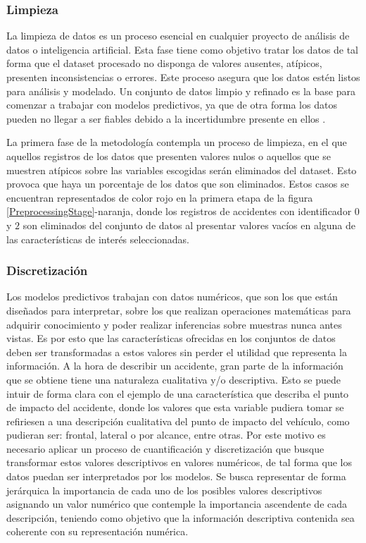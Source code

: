 \subsubsection{Limpieza}

La limpieza de datos es un proceso esencial en cualquier proyecto de análisis de datos o inteligencia artificial. Esta fase tiene como objetivo tratar los datos de tal forma que el dataset procesado no disponga de valores ausentes, atípicos, presenten inconsistencias o errores. Este proceso asegura que los datos estén listos para análisis y modelado. Un conjunto de datos limpio y refinado es la base para comenzar a trabajar con modelos predictivos, ya que de otra forma los datos pueden no llegar a ser fiables debido a la incertidumbre presente en ellos \cite{ilyas2019data}.

La primera fase de la metodología contempla un proceso de limpieza, en el que aquellos registros de los datos que presenten valores nulos o aquellos que se muestren atípicos sobre las variables escogidas serán eliminados del dataset. Esto provoca que haya un porcentaje de los datos que son eliminados. Estos casos se encuentran representados de color rojo en la primera etapa de la figura \ref{PreprocessingStage}-naranja, donde los registros de accidentes con identificador $0$ y $2$ son eliminados del conjunto de datos al presentar valores vacíos en alguna de las características de interés seleccionadas.


\subsubsection{Discretización}

Los modelos predictivos trabajan con datos numéricos, que son los que están diseñados para interpretar, sobre los que realizan operaciones matemáticas para adquirir conocimiento y poder realizar inferencias sobre muestras nunca antes vistas. Es por esto que las características ofrecidas en los conjuntos de datos deben ser transformadas a estos valores sin perder el utilidad que representa la información. A la hora de describir un accidente, gran parte de la información que se obtiene tiene una naturaleza cualitativa y/o descriptiva. Esto se puede intuir de forma clara con el ejemplo de una característica que describa el punto de impacto del accidente, donde los valores que esta variable pudiera tomar se refiriesen a una descripción cualitativa del punto de impacto del vehículo, como pudieran ser: frontal, lateral o por alcance, entre otras. Por este motivo es necesario aplicar un proceso de cuantificación y discretización que busque transformar estos valores descriptivos en valores numéricos, de tal forma que los datos puedan ser interpretados por los modelos. Se busca representar de forma jerárquica la importancia de cada uno de los posibles valores descriptivos asignando un valor numérico que contemple la importancia ascendente de cada descripción, teniendo como objetivo que la información descriptiva contenida sea coherente con su representación numérica.

